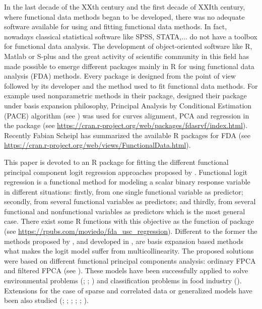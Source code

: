 In the last decade of the XXth century and the first decade of XXIth century, where functional data methods began to be developed, there was no adequate software available for using and fitting functional data methods. In fact, nowadays classical statistical software like SPSS, STATA,... do not have a toolbox for functional data analysis. The development of object-oriented software like R, Matlab or S-plus and the great activity of scientific community in this field has made possible to emerge different packages mainly in R for using functional data analysis (FDA) methods. Every package is designed from the point of view followed by its developer and the method used to fit functional data methods. For example \cite{Febrero2012} used nonparametric methods in their  package, \cite{Ramsay09} designed their  package under basis expansion philosophy, Principal Analysis by Conditional Estimation (PACE) algorithm (see \citealp{Zhu2014}) was used for curves alignment, PCA and regression in the  package (see \url{https://cran.r-project.org/web/packages/fdasrvf/index.html}). Recently Fabian Scheipl has summarized the available R packages for FDA (see \url{https://cran.r-project.org/web/views/FunctionalData.html}).

This paper is devoted to  an R package for fitting the different functional principal component logit regression approaches proposed by \cite{Escabias04}. Functional logit regression is a functional method for modeling a scalar binary response variable in different situations: firstly, from one single functional variable as predictor; secondly, from several functional variables as predictors; and thirdly, from several functional and nonfunctional variables as predictors which is the most general case. There exist some R functions with this objective as the  function of  package (see \url{https://rpubs.com/moviedo/fda_usc_regression}). Different to the former the methods proposed by \cite{Escabias04}, and developed in , are basis expansion based methods what makes the logit model suffer from multicollinearity. The proposed solutions were based on different functional principal components analysis: ordinary FPCA and filtered FPCA (see \citealp{Escabias2014}). These models have been successfully applied to solve environmental problems (\citealp{Aguilera20083187}; \citealp{Escabias200595}; \citealp{Escabias2013}) and classification problems in food industry (\citealp{AguileraLisboa}). Extensions for the case of sparse and correlated data or generalized models have been also studied (\citealp{James2002}; \citealp{Muller05}; \citealp{AguileraMorillo2012}; \citealp{Mousavi2018}; \citealp{Tapia2019}; \citealp{Bianco2021}).

